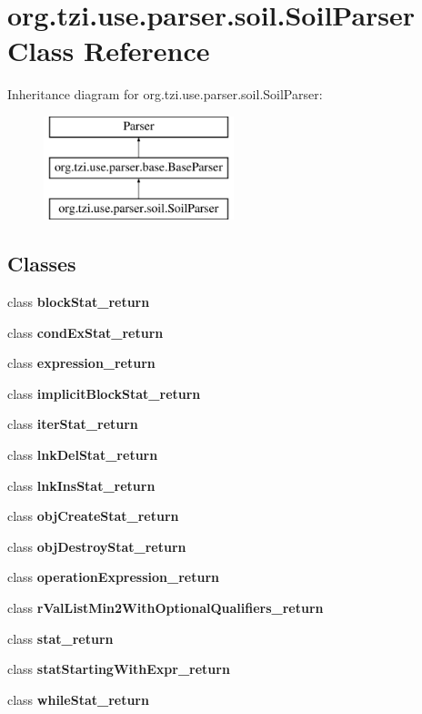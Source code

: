 \hypertarget{classorg_1_1tzi_1_1use_1_1parser_1_1soil_1_1_soil_parser}{\section{org.\-tzi.\-use.\-parser.\-soil.\-Soil\-Parser Class Reference}
\label{classorg_1_1tzi_1_1use_1_1parser_1_1soil_1_1_soil_parser}
}
Inheritance diagram for org.\-tzi.\-use.\-parser.\-soil.\-Soil\-Parser\-:\begin{figure}[H]
\begin{center}
\leavevmode
\includegraphics[height=3.000000cm]{classorg_1_1tzi_1_1use_1_1parser_1_1soil_1_1_soil_parser}
\end{center}
\end{figure}
\subsection*{Classes}
\begin{DoxyCompactItemize}
\item 
class {\bfseries block\-Stat\-\_\-return}
\item 
class {\bfseries cond\-Ex\-Stat\-\_\-return}
\item 
class {\bfseries expression\-\_\-return}
\item 
class {\bfseries implicit\-Block\-Stat\-\_\-return}
\item 
class {\bfseries iter\-Stat\-\_\-return}
\item 
class {\bfseries lnk\-Del\-Stat\-\_\-return}
\item 
class {\bfseries lnk\-Ins\-Stat\-\_\-return}
\item 
class {\bfseries obj\-Create\-Stat\-\_\-return}
\item 
class {\bfseries obj\-Destroy\-Stat\-\_\-return}
\item 
class {\bfseries operation\-Expression\-\_\-return}
\item 
class {\bfseries r\-Val\-List\-Min2\-With\-Optional\-Qualifiers\-\_\-return}
\item 
class {\bfseries stat\-\_\-return}
\item 
class {\bfseries stat\-Starting\-With\-Expr\-\_\-return}
\item 
class {\bfseries while\-Stat\-\_\-return}
\end{DoxyCompactItemize}
